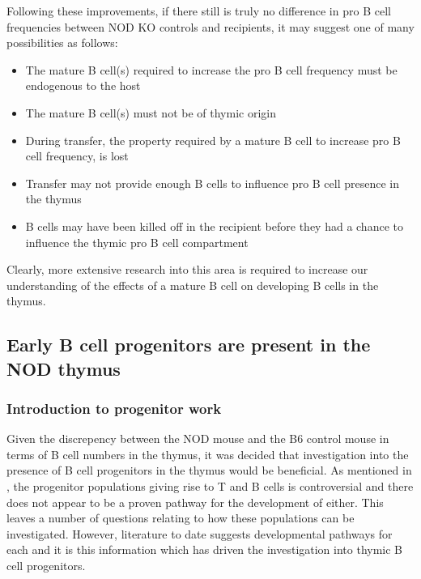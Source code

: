 Following these improvements, if there still is truly no difference in pro B cell frequencies between NOD KO controls and recipients, it may suggest one of many possibilities as follows:
\begin{itemize}
\item The mature B cell(s) required to increase the pro B cell frequency must be endogenous to the host
\item The mature B cell(s) must not be of thymic origin
\item During transfer, the property required by a mature B cell to increase pro B cell frequency, is lost
\item Transfer may not provide enough B cells to influence pro B cell presence in the thymus
\item B cells may have been killed off in the recipient before they had a chance to influence the thymic pro B cell compartment
\end{itemize}

Clearly, more extensive research into this area is required to increase our understanding of the effects of a mature B cell on developing B cells in the thymus.



\subsection{Early B cell progenitors are present in the NOD thymus}

\subsubsection{Introduction to progenitor work}

Given the discrepency between the NOD mouse and the B6 control mouse in terms of B cell numbers in the thymus, it was decided that investigation into the presence of B cell progenitors in the thymus would be beneficial.
As mentioned in , the progenitor populations giving rise to T and B cells is controversial and there does not appear to be a proven pathway for the development of either.
This leaves a number of questions relating to how these populations can be investigated.
However, literature to date suggests developmental pathways for each and it is this information which has driven the investigation into thymic B cell progenitors.

